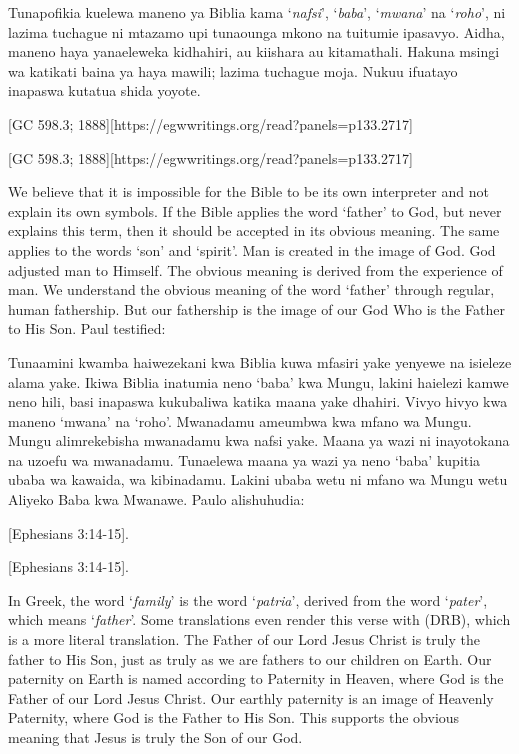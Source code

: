 Tunapofikia kuelewa maneno ya Biblia kama ‘\textit{nafsi}’, ‘\textit{baba}’, ‘\textit{mwana}’ na ‘\textit{roho}’, ni lazima tuchague ni mtazamo upi tunaounga mkono na tuitumie ipasavyo. Aidha, maneno haya yanaeleweka kidhahiri, au kiishara au kitamathali. Hakuna msingi wa katikati baina ya haya mawili; lazima tuchague moja. Nukuu ifuatayo inapaswa kutatua shida yoyote.


[GC 598.3; 1888][https://egwwritings.org/read?panels=p133.2717]


[GC 598.3; 1888][https://egwwritings.org/read?panels=p133.2717]


We believe that it is impossible for the Bible to be its own interpreter and not explain its own symbols. If the Bible applies the word ‘father’ to God, but never explains this term, then it should be accepted in its obvious meaning. The same applies to the words ‘son’ and ‘spirit’. Man is created in the image of God. God adjusted man to Himself. The obvious meaning is derived from the experience of man. We understand the obvious meaning of the word ‘father’ through regular, human fathership. But our fathership is the image of our God Who is the Father to His Son. Paul testified:


Tunaamini kwamba haiwezekani kwa Biblia kuwa mfasiri yake yenyewe na isieleze alama yake. Ikiwa Biblia inatumia neno ‘baba’ kwa Mungu, lakini haielezi kamwe neno hili, basi inapaswa kukubaliwa katika maana yake dhahiri. Vivyo hivyo kwa maneno ‘mwana’ na ‘roho’. Mwanadamu ameumbwa kwa mfano wa Mungu. Mungu alimrekebisha mwanadamu kwa nafsi yake. Maana ya wazi ni inayotokana na uzoefu wa mwanadamu. Tunaelewa maana ya wazi ya neno ‘baba’ kupitia ubaba wa kawaida, wa kibinadamu. Lakini ubaba wetu ni mfano wa Mungu wetu Aliyeko Baba kwa Mwanawe. Paulo alishuhudia:


[Ephesians 3:14-15].


[Ephesians 3:14-15].


In Greek, the word ‘\textit{family}’ is the word ‘\textit{patria}’, derived from the word ‘\textit{pater}’, which means ‘\textit{father}’. Some translations even render this verse with  (DRB), which is a more literal translation. The Father of our Lord Jesus Christ is truly the father to His Son, just as truly as we are fathers to our children on Earth. Our paternity on Earth is named according to Paternity in Heaven, where God is the Father of our Lord Jesus Christ. Our earthly paternity is an image of Heavenly Paternity, where God is the Father to His Son. This supports the obvious meaning that Jesus is truly the Son of our God.


